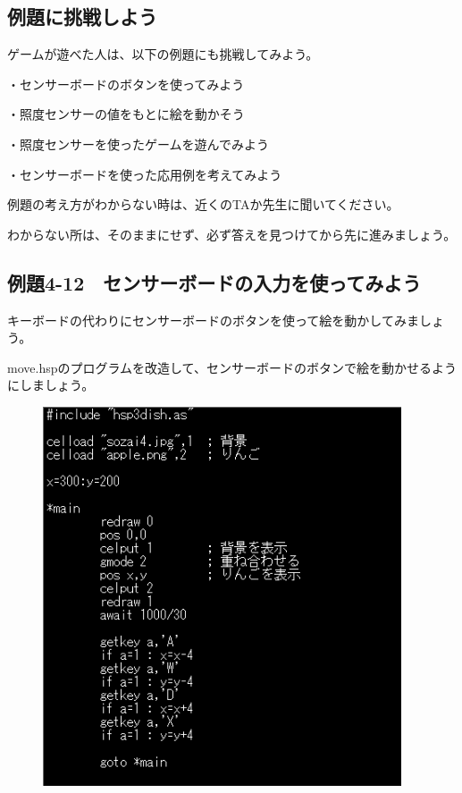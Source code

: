 \subsection{例題に挑戦しよう}

ゲームが遊べた人は、以下の例題にも挑戦してみよう。

・センサーボードのボタンを使ってみよう

・照度センサーの値をもとに絵を動かそう

・照度センサーを使ったゲームを遊んでみよう

・センサーボードを使った応用例を考えてみよう


例題の考え方がわからない時は、近くのTAか先生に聞いてください。

わからない所は、そのままにせず、必ず答えを見つけてから先に進みましょう。

\newpage
\subsection{例題4-12　センサーボードの入力を使ってみよう}


\begin{description}
    \item {}
\end{description}

キーボードの代わりにセンサーボードのボタンを使って絵を動かしてみましょう。

move.hspのプログラムを改造して、センサーボードのボタンで絵を動かせるようにしましょう。

\begin{figure}[H]
    \begin{center}
      \includegraphics[keepaspectratio,width=10.61cm,height=11.229cm]{text04-img/s_move.png}
    \end{center}
    \label{fig:prog_menu}
\end{figure}

